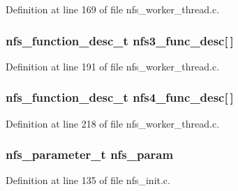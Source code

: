 Definition at line 169 of file nfs\_\-worker\_\-thread.c.
\subsubsection[{nfs3\_\-func\_\-desc}]{\setlength{\rightskip}{0pt plus 5cm}nfs\_\-function\_\-desc\_\-t {\bf nfs3\_\-func\_\-desc}[$\,$]}\label{nfs__dupreq_8c_177ddde86497df151d3b3ff5c876d90a}




Definition at line 191 of file nfs\_\-worker\_\-thread.c.
\subsubsection[{nfs4\_\-func\_\-desc}]{\setlength{\rightskip}{0pt plus 5cm}nfs\_\-function\_\-desc\_\-t {\bf nfs4\_\-func\_\-desc}[$\,$]}\label{nfs__dupreq_8c_de3381a451007489495bf0b92585520f}




Definition at line 218 of file nfs\_\-worker\_\-thread.c.
\subsubsection[{nfs\_\-param}]{\setlength{\rightskip}{0pt plus 5cm}nfs\_\-parameter\_\-t {\bf nfs\_\-param}}\label{nfs__dupreq_8c_eb8fc46586993cf210777049fca03969}




Definition at line 135 of file nfs\_\-init.c.